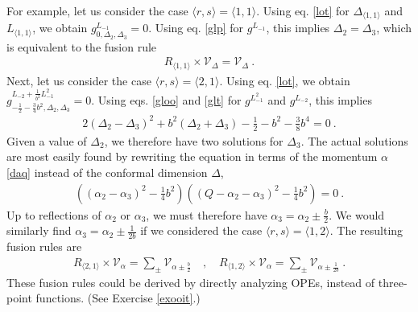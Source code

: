 \documentclass[12pt, a4paper, notitlepage, twoside]{report}
\numberwithin{equation}{section}
\theoremstyle{break}
\begin{document}
For example, let us consider the case $\langle r,s \rangle = \langle 1,1 \rangle$.
Using eq. \eqref{lot} for $\Delta_{\langle 1,1 \rangle}$ and $L_{\langle 1,1 \rangle}$, we obtain
$g^{L_{-1}}_{0,\Delta_2,\Delta_3} = 0$.
Using eq. \eqref{glp} for $g^{L_{-1}}$, this implies 
$
 \Delta_2=\Delta_3
$,
which is equivalent to the fusion rule
\begin{align}
 \boxed{R_{\langle 1,1\rangle} \times \mathcal{V}_\Delta = \mathcal{V}_\Delta} \ .
\end{align}
Next, let us consider the case $\langle r,s \rangle = \langle 2,1 \rangle$.
Using eq. \eqref{lot}, we obtain 
$g^{L_{-2} +\frac{1}{b^2} L_{-1}^2 }_{-\frac12 -\frac34 b^2,\Delta_2,\Delta_3} = 0$.
Using eqs. \eqref{gloo} and \eqref{glt} for $g^{L_{-1}^2}$ and $g^{L_{-2}}$, this implies
\begin{align}
 2(\Delta_2-\Delta_3)^2 + b^2 (\Delta_2+\Delta_3) - \frac12 - b^2 -\frac38 b^4= 0\ .
\end{align}
Given a value of $\Delta_2$, we therefore have two solutions for $\Delta_3$.
The actual solutions are most easily found by rewriting the equation in terms of the momentum $\alpha$ \eqref{daq} instead of the conformal dimension $\Delta$,
\begin{align}
 \left((\alpha_2-\alpha_3)^2 -\frac14 b^2\right)\left((Q-\alpha_2-\alpha_3)^2 -\frac14 b^2\right) = 0\ .
\end{align}
Up to reflections of $\alpha_2$ or $\alpha_3$, we must therefore have
$
 \alpha_3 = \alpha_2 \pm \frac{b}{2}
$.
We would similarly find $\alpha_3 = \alpha_2 \pm \frac{1}{2b}$ if we considered the case $\langle r,s\rangle = \langle 1,2\rangle$. 
The resulting fusion rules are 
\begin{align}
\boxed{ R_{\langle 2,1 \rangle}\times \mathcal{V}_\alpha = \sum_\pm \mathcal{V}_{\alpha \pm \frac{b}{2}} }\quad , \quad 
\boxed{ R_{\langle 1,2 \rangle}\times \mathcal{V}_\alpha = \sum_\pm \mathcal{V}_{\alpha \pm \frac{1}{2b}} }\ .
\label{rot}
\end{align}
These fusion rules could be derived by directly analyzing OPEs, instead of three-point functions. (See Exercise \ref{exooit}.) 
\end{document}
